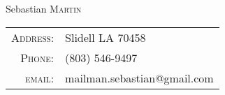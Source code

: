 \documentclass[a4paper,10pt]{article}
\begin{document}

\pagestyle{empty} %

\par{\centering
		{\Huge Sebastian \textsc{Martin}
	}\par}

\begin{center}
	\begin{tabular}{r|l}
    \textsc{Address:}   & Slidell LA 70458\\
    \textsc{Phone:}     & (803) 546-9497\\
    \textsc{email:}     & {mailman.sebastian@gmail.com}
\end{tabular}
\end{center}


\end{document}
